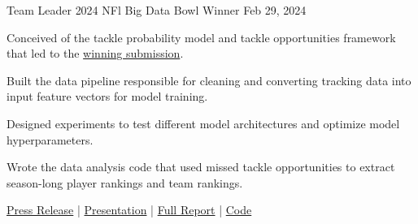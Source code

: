

\begin{cventries}
    
\cventry
{Team Leader} %
{2024 NFl Big Data Bowl Winner}
{} %
{Feb 29, 2024} %
{
  \begin{cvitems} %
    \item {Conceived of the tackle probability model and tackle opportunities framework that led to the \href{https://www.kaggle.com/code/matthewpchang/uncovering-missed-tackle-opportunities}{winning submission}.}
    \item {Built the data pipeline responsible for cleaning and converting tracking data into input feature vectors for model training.}
    \item {Designed experiments to test different model architectures and optimize model hyperparameters.}
    \item {Wrote the data analysis code that used missed tackle opportunities to extract season-long player rankings and team rankings.} 
    \item {\href{https://operations.nfl.com/gameday/analytics/big-data-bowl/2024-big-data-bowl-winner-and-finalists/}{Press Release} | \href{https://www.loom.com/share/54c67d584ee34efbb799e8dbbd551091}{Presentation} | \href{https://www.kaggle.com/code/matthewpchang/uncovering-missed-tackle-opportunities}{Full Report} | \href{https://github.com/mpchang/uncovering-missed-tackle-opportunities}{Code}}
  \end{cvitems}
}



\end{cventries}
